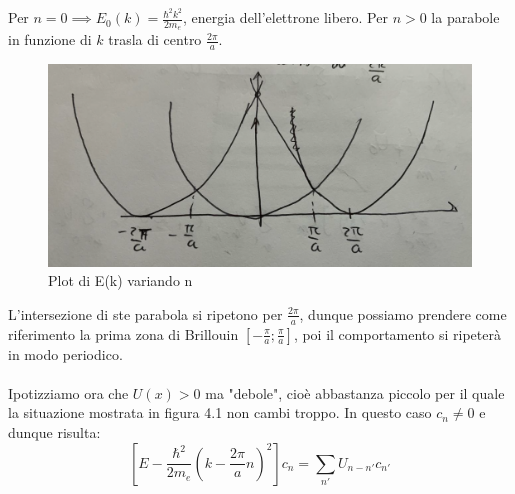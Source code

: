 \documentclass{book}
\begin{document}
                Per $n=0 \implies E_{0}(k) = \displaystyle \frac{\hbar ^{2}k^{2}}{2m_{e}}$, energia dell'elettrone libero. Per $n>0$ la parabole in funzione di $k$ trasla di centro $\frac{2\pi}{a}$.
                \begin{figure}[h!]
                    \centering
                    \includegraphics[width=0.5\linewidth]{img/paraboloneLez20.png}
                    \caption{Plot di E(k) variando n}
                \end{figure}
                L'intersezione di ste parabola si ripetono per $\displaystyle \frac{2 \pi}{a}$, dunque possiamo prendere come riferimento la prima zona di Brillouin $[-\frac{\pi}{a}; \frac{\pi}{a}]$, poi il comportamento si ripeterà in modo periodico.

                \paragraph{}
                    Ipotizziamo ora che $U(x)>0$ ma "debole", cioè abbastanza piccolo per il quale la situazione mostrata in figura 4.1 non cambi troppo. In questo caso $c_{n} \neq 0$ e dunque risulta:
                    $$[E - \frac{\hbar ^{2}}{2m_{e}}(k - \frac{2\pi }{a}n)^{2}]c_{n}= \sum_{n'}U_{n-n'}c_{n'} $$
\end{document}
